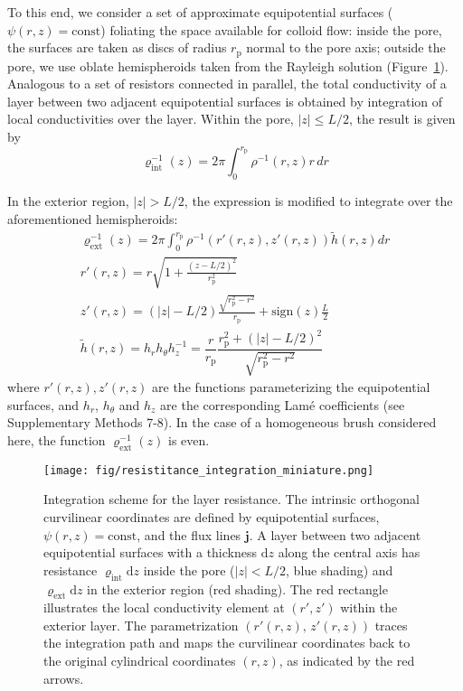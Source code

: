 \documentclass[12pt, a4paper]{article}
\begin{document}
To this end, we consider a set of approximate equipotential surfaces ($\psi(r,z)=\text{const}$) foliating the space available for colloid flow: inside the pore, the surfaces are taken as  discs of radius $r_{\text{p}}$ normal to the pore axis; outside the pore, we use oblate hemispheroids taken from the Rayleigh solution \cite{Strutt1878} (Figure~\ref{fig:integration_scheme}).
Analogous to a set of resistors connected in parallel, the total conductivity of a layer between two adjacent equipotential surfaces is obtained by integration of local conductivities over the layer. Within the pore, $|z|\leq L/2$, the result is given by
\begin{equation}
\varrho_{\text{int}}^{-1}(z)= 2\pi\int_{0}^{r_{\text{p}}^{}} \rho^{-1}(r,z) r \, dr
\label{eq:varrho1}
\end{equation}

In the exterior region, $|z| >L/2$, the expression is modified to integrate over the aforementioned hemispheroids:
\begin{equation}
    \begin{gathered}
        \varrho_{\text{ext}}^{-1}(z)= 2\pi\int_{0}^{r_{\text{p}}^{}} \rho^{-1}\left( r'(r,z), z'(r,z) \right)  \tilde{h} (r,z) dr\\
        r'(r,z) = r\sqrt{1 + \frac{(z - L/2)^2}{r_{\text{p}}^2}}\\
        z'(r,z) = (|z| - L/2) \frac{\sqrt{r_{\text{p}}^2 - r^2}}{r_{\text{p}}} +  \text{sign}(z) \frac{L}{2}\\
        \tilde{h} (r,z) = h_r h_{\theta} h_z^{-1} = \dfrac{r}{r_{\text{p}}}\dfrac{r_{\text{p}}^2 + (|z|-L/2)^2}{\sqrt{r_{\text{p}}^2 - r^2}}
    \end{gathered}
\label{eq:varrho2}
\end{equation}
where $r'(r,z) , z'(r,z)$ are the functions parameterizing the equipotential surfaces, and $h_r$, $h_{\theta}$ and $h_z$ are the corresponding Lam\'e coefficients (see Supplementary Methods 7-8). In the case of a homogeneous brush considered here, the function $\varrho_{\text{ext}}^{-1}(z)$ is even.

\begin{figure}
    \centering
    \texttt{[image: fig/resistitance\_integration\_miniature.png]}
    \caption{
    Integration scheme for the layer resistance.  
    The intrinsic orthogonal curvilinear coordinates are defined by equipotential surfaces, \mbox{$\psi(r,z) = \text{const}$}, and the flux lines $\bm{j}$.  
    A layer between two adjacent equipotential surfaces with a thickness $\text{d}z$ along the central axis has resistance $\varrho_{\text{int}}\text{d}z$ inside the pore ($|z|<L/2$, blue shading) and $\varrho_{\text{ext}}\text{d}z$ in the exterior region (red shading).  
    The red rectangle illustrates the local conductivity element at $(r',z')$ within the exterior layer.  
    The parametrization $(r'(r,z),\,z'(r,z))$ traces the integration path and maps the curvilinear coordinates back to the original cylindrical coordinates $(r,z)$, as indicated by the red arrows.
    }
    \label{fig:integration_scheme}
\end{figure}
\end{document}
